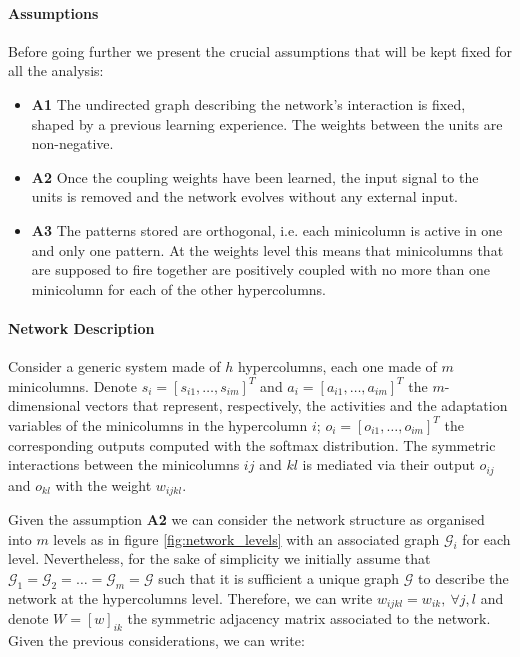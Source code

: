 \paragraph{Assumptions}
Before going further we present the crucial assumptions that will be kept fixed for all the analysis:
 \begin{itemize}
     \item \textbf{A1} The undirected graph describing the network's interaction is fixed, shaped by a previous learning experience.  The weights between the units are non-negative.
     \item \textbf{A2} Once the coupling weights have been learned, the input signal to the units is removed and the network evolves without any external input.
     \item \textbf{A3} The patterns stored are orthogonal, i.e. each minicolumn is active in one and only one pattern. At the weights level this means that minicolumns that are supposed to fire together are positively coupled with no more than one minicolumn for each of the other hypercolumns. 
 \end{itemize}
 
\paragraph{Network Description}
Consider a generic system made of $h$ hypercolumns, each one made of $m$ minicolumns. Denote $s_i = [s_{i1}, \dots, s_{im}]^T$ and $a_i = [a_{i1}, \dots, a_{im}]^T$ the $m$-dimensional vectors that represent, respectively, the activities and the adaptation variables of the minicolumns in the hypercolumn $i$; $o_i = [o_{i1}, \dots, o_{im}]^T$ the corresponding outputs computed with the softmax distribution. The symmetric interactions between the minicolumns $ij$ and $kl$ is mediated via their output $o_{ij}$ and $o_{kl}$ with the weight \textbf{$w_{ijkl}$}.

Given the assumption \textbf{A2} we can consider the network structure as organised into $m$ levels as in figure \cref{fig:network_levels} with an associated graph $\mathcal{G}_i$ for each level. Nevertheless, for the sake of simplicity we initially assume that $\mathcal{G}_1 = \mathcal{G}_2 = \dots = \mathcal{G}_m=\mathcal{G}$ such that it is sufficient a unique graph $\mathcal{G}$ to describe the network at the hypercolumns level. Therefore, we can write $w_{ijkl}=w_{ik},\ \forall j, l$ and denote $W =\left[w\right]_{ik}$ the symmetric adjacency matrix associated to the network. Given the previous considerations, we can write:

